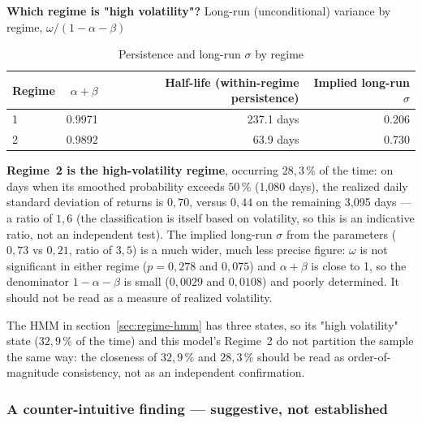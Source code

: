 \documentclass[12pt,a4paper]{article}
\begin{document}
\vspace{0.3cm}

\textbf{Which regime is "high volatility"?} Long-run
(unconditional) variance by regime, $\omega/(1-\alpha-\beta)$

\begin{table}[H]
	\centering
	\caption{Persistence and long-run $\sigma$ by regime}
	\begin{tabular}{lrrr}
		\toprule
		Regime & $\alpha+\beta$ & Half-life (within-regime persistence) & Implied long-run $\sigma$ \\
		\midrule
		1 & 0.9971 & 237.1 days & 0.206 \\
		2 & 0.9892 & 63.9 days & 0.730 \\
		\bottomrule
	\end{tabular}
\end{table}


\textbf{Regime~2 is the high-volatility regime}, occurring
$28{,}3\,\%$ of the time: on days when its smoothed probability exceeds
$50\,\%$ (1,080 days), the realized daily standard deviation of
returns is $0{,}70$, versus $0{,}44$ on the remaining 3,095
days --- a ratio of $1{,}6$ (the classification is itself based
on volatility, so this is an indicative ratio, not an
independent test). The implied long-run $\sigma$ from the parameters
($0{,}73$ vs $0{,}21$, ratio of $3{,}5$) is a much
wider, much less precise figure: $\omega$ is not significant in either
regime ($p=0{,}278$ and $0{,}075$) and $\alpha+\beta$ is close to
1, so the denominator $1-\alpha-\beta$ is small ($0{,}0029$
and $0{,}0108$) and poorly determined. It should not be read as a
measure of realized volatility.

\vspace{0.3cm}

\begin{limitbox}
	The HMM in section~\ref{sec:regime-hmm} has three states, so
	its "high volatility" state ($32{,}9\,\%$ of the time) and this
	model's Regime~2 do not partition the sample the same
	way: the closeness of $32{,}9\,\%$ and $28{,}3\,\%$ should be read
	as order-of-magnitude consistency, not as an
	independent confirmation.
\end{limitbox}

\vspace{0.3cm} 

\subsubsection{A counter-intuitive finding --- suggestive, not established}
\end{document}
